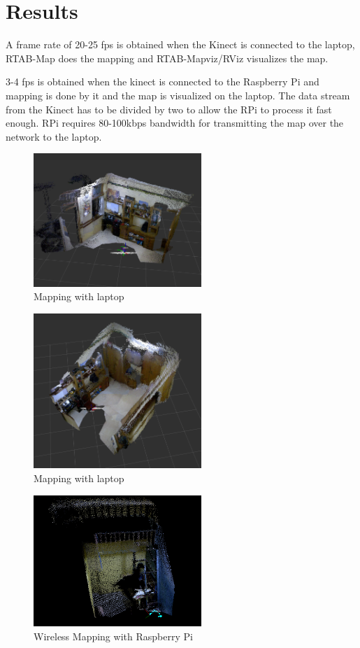 \documentclass[journal]{IEEEtran}
\begin{document}
\section{Results}
A frame rate of 20-25 fps is obtained when the Kinect is connected to the laptop, RTAB-Map does the mapping and RTAB-Mapviz/RViz visualizes the map. 

3-4 fps is obtained when the kinect is connected to the Raspberry Pi and mapping is done by it and the map is visualized on the laptop. The data stream from the Kinect has to be divided by two to allow the RPi to process it fast enough. RPi requires 80-100kbps bandwidth for transmitting the map over the network to the laptop.



\begin{figure}[ht]
\centering
\includegraphics[width=2.5in]{1(1).png}
\caption{Mapping with laptop}
\label{fig_sim}
\end{figure}
 
\begin{figure}[ht]
	\centering
	\includegraphics[width=2.5in]{1(2).png}
	\caption{Mapping with laptop}
	\label{fig_sim}
\end{figure}

\begin{figure}[ht]
	\centering
	\includegraphics[width=2.5in]{2(1).png}
	\caption{Wireless Mapping with Raspberry Pi}
	\label{fig_sim}
\end{figure}
\end{document}
